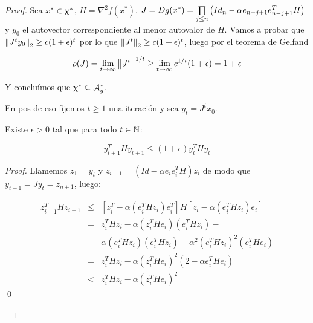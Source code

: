 \begin{proof}
	Sea $x^* \in \upchi^*$, $H = \nabla^2 f(x^*)$, 
	$J=Dg(x^*) = \prod\limits_{j \leq n}{\left(Id_n - \alpha e_{n-j+1}e_{n-j+1}^T H\right)}$ y $y_0$ el autovector correspondiente al menor autovalor de $H$. Vamos a probar que $\left\lVert J^t y_0\right\rVert_2 \geq c(1+\epsilon)^t$ por lo que $\left\lVert J^t\right\rVert _2 \geq  c(1+\epsilon)^t$, luego por el teorema de Gelfand
	
	
	\begin{equation*}
	\rho(J) = \lim\limits_{t \rightarrow \infty}{\left\lVert J^t\right\rVert^{1/t}} \geq \lim\limits_{t \rightarrow \infty}{c^{1/t} (1+\epsilon)} = 1 + \epsilon 
	\end{equation*}
	
	Y conclu\'imos que $\upchi^* \subseteq \mathcal{A}_{g}^{*}$.
	
	En pos de eso fijemos $t \geq 1$ una iteraci\'on y sea $y_t = J^t x_0$.
	
	\begin{lemma}
		\label{lemma1 : DC los puntos silla estrictos son fijos inestables}
		Existe $\epsilon >0$ tal que para todo $t \in {\mathbb{N}}$:
		
		\begin{equation*}
		\label{eq_1: DC los puntos silla estrictos son fijos inestables}
		y_{t+1}^THy_{t+1} \leq (1+\epsilon) y_{t}^THy_{t} 
		\end{equation*}
		
	\end{lemma}
	
	\begin{proof}
		Llamemos $z_1 = y_t$ y $z_{i+1} = \left(Id - \alpha e_i e_i^TH\right)z_i$ de modo que $y_{t+1} = Jy_t = z_{n+1}$, luego:
		
		\begin{equation*}
		\begin{aligned}
			z_{i+1}^THz_{i+1} & \leq & \left[z_i^T - \alpha \left( e_i^T H z_i \right) e_i^T \right]H \left[ z_i - \alpha \left(e_i^T H z_i \right) e_i \right] \\
			& = & z_i^T H z_i - \alpha \left(z_i^T H e_i\right)\left(e_i^T H z_i\right) - \\
			&& \alpha \left(e_i^T H z_i\right)\left(e_i^T H z_i\right) + \alpha^2 \left(e_i^T H z_i\right)^2\left(e_i^T H e_i\right) \\
			& = & z_i^T H z_i -  \alpha \left(z_i^T H e_i\right)^2 \left(2 - \alpha  e_i^T H e_i\right) \\
			& < & z_i^T H z_i -  \alpha \left(z_i^T H e_i\right)^2 
		\end{aligned} 
		\end{equation*}\qed
	\end{proof}


\end{proof}
